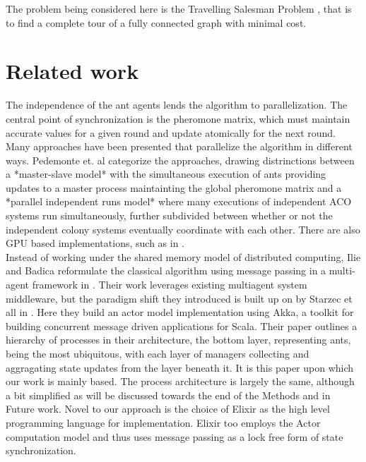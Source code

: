 \documentclass[12pt]{article}
\begin{document}
    The problem being considered here is the Travelling Salesman Problem \cite{wikiTSP},
    that is to find a complete tour of a fully connected graph with minimal 
    cost.


\section{Related work}
The independence of the ant agents lends the algorithm to parallelization. 
The central point of synchronization is the pheromone matrix, which must 
maintain accurate values for a given round and update atomically for the 
next round. Many approaches have been presented that parallelize the algorithm 
in different ways. Pedemonte et. al \cite{SurveyParallel} categorize 
the approaches, drawing distrinctions between a *master-slave model*
with the simultaneous execution of ants providing updates to 
a master process maintainting the global pheromone matrix and a
*parallel independent runs model* where many
executions of independent ACO systems run simultaneously,
further subdivided between
whether or not the independent colony systems eventually coordinate
 with each other. 
There are also GPU based implementations, such as in \cite{GPU}.
\\

Instead of working under the shared memory model of distributed 
computing, Ilie and Badica
reformulate the classical algorithm using message 
passing in a multi-agent framework  in \cite{multiagent}.
Their work leverages existing multiagent system middleware, but the paradigm
shift they introduced is built up on by Starzec et all in \cite{star1}.
Here they build an actor model\cite{ActorModel} implementation
using Akka, a toolkit for building concurrent message driven applications 
for Scala. Their paper outlines a hierarchy of processes in their architecture,
the bottom layer, representing ants, being the most ubiquitous, with each 
layer of managers collecting and aggragating state updates from the layer
beneath it. It is this paper upon which our work is mainly based.
The process architecture is largely the same, although a bit simplified 
as will be discussed towards the end of the Methods and in Future work. 
Novel to our approach is the choice of Elixir as the high level programming
language for implementation. Elixir too employs the Actor computation model and 
thus uses message passing as a lock free form of state synchronization.
\end{document}

